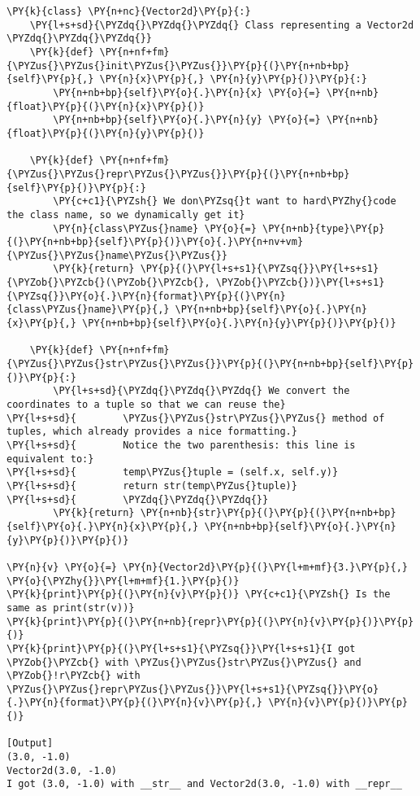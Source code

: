 \begin{Verbatim}[label=\makebox{\url{https://github.com/lucabaldini/cmepda/tree/master/slides/latex/snippets/vector2d\_printable.py}},commandchars=\\\{\}]
\PY{k}{class} \PY{n+nc}{Vector2d}\PY{p}{:}
    \PY{l+s+sd}{\PYZdq{}\PYZdq{}\PYZdq{} Class representing a Vector2d \PYZdq{}\PYZdq{}\PYZdq{}}   
    \PY{k}{def} \PY{n+nf+fm}{\PYZus{}\PYZus{}init\PYZus{}\PYZus{}}\PY{p}{(}\PY{n+nb+bp}{self}\PY{p}{,} \PY{n}{x}\PY{p}{,} \PY{n}{y}\PY{p}{)}\PY{p}{:}
        \PY{n+nb+bp}{self}\PY{o}{.}\PY{n}{x} \PY{o}{=} \PY{n+nb}{float}\PY{p}{(}\PY{n}{x}\PY{p}{)}
        \PY{n+nb+bp}{self}\PY{o}{.}\PY{n}{y} \PY{o}{=} \PY{n+nb}{float}\PY{p}{(}\PY{n}{y}\PY{p}{)}
   
    \PY{k}{def} \PY{n+nf+fm}{\PYZus{}\PYZus{}repr\PYZus{}\PYZus{}}\PY{p}{(}\PY{n+nb+bp}{self}\PY{p}{)}\PY{p}{:}
        \PY{c+c1}{\PYZsh{} We don\PYZsq{}t want to hard\PYZhy{}code the class name, so we dynamically get it}
        \PY{n}{class\PYZus{}name} \PY{o}{=} \PY{n+nb}{type}\PY{p}{(}\PY{n+nb+bp}{self}\PY{p}{)}\PY{o}{.}\PY{n+nv+vm}{\PYZus{}\PYZus{}name\PYZus{}\PYZus{}}
        \PY{k}{return} \PY{p}{(}\PY{l+s+s1}{\PYZsq{}}\PY{l+s+s1}{\PYZob{}\PYZcb{}(\PYZob{}\PYZcb{}, \PYZob{}\PYZcb{})}\PY{l+s+s1}{\PYZsq{}}\PY{o}{.}\PY{n}{format}\PY{p}{(}\PY{n}{class\PYZus{}name}\PY{p}{,} \PY{n+nb+bp}{self}\PY{o}{.}\PY{n}{x}\PY{p}{,} \PY{n+nb+bp}{self}\PY{o}{.}\PY{n}{y}\PY{p}{)}\PY{p}{)}
        
    \PY{k}{def} \PY{n+nf+fm}{\PYZus{}\PYZus{}str\PYZus{}\PYZus{}}\PY{p}{(}\PY{n+nb+bp}{self}\PY{p}{)}\PY{p}{:}
        \PY{l+s+sd}{\PYZdq{}\PYZdq{}\PYZdq{} We convert the coordinates to a tuple so that we can reuse the}
\PY{l+s+sd}{        \PYZus{}\PYZus{}str\PYZus{}\PYZus{} method of tuples, which already provides a nice formatting.}
\PY{l+s+sd}{        Notice the two parenthesis: this line is equivalent to:}
\PY{l+s+sd}{        temp\PYZus{}tuple = (self.x, self.y)}
\PY{l+s+sd}{        return str(temp\PYZus{}tuple)}
\PY{l+s+sd}{        \PYZdq{}\PYZdq{}\PYZdq{}}
        \PY{k}{return} \PY{n+nb}{str}\PY{p}{(}\PY{p}{(}\PY{n+nb+bp}{self}\PY{o}{.}\PY{n}{x}\PY{p}{,} \PY{n+nb+bp}{self}\PY{o}{.}\PY{n}{y}\PY{p}{)}\PY{p}{)}
     
\PY{n}{v} \PY{o}{=} \PY{n}{Vector2d}\PY{p}{(}\PY{l+m+mf}{3.}\PY{p}{,} \PY{o}{\PYZhy{}}\PY{l+m+mf}{1.}\PY{p}{)}
\PY{k}{print}\PY{p}{(}\PY{n}{v}\PY{p}{)} \PY{c+c1}{\PYZsh{} Is the same as print(str(v))}
\PY{k}{print}\PY{p}{(}\PY{n+nb}{repr}\PY{p}{(}\PY{n}{v}\PY{p}{)}\PY{p}{)}
\PY{k}{print}\PY{p}{(}\PY{l+s+s1}{\PYZsq{}}\PY{l+s+s1}{I got \PYZob{}\PYZcb{} with \PYZus{}\PYZus{}str\PYZus{}\PYZus{} and \PYZob{}!r\PYZcb{} with \PYZus{}\PYZus{}repr\PYZus{}\PYZus{}}\PY{l+s+s1}{\PYZsq{}}\PY{o}{.}\PY{n}{format}\PY{p}{(}\PY{n}{v}\PY{p}{,} \PY{n}{v}\PY{p}{)}\PY{p}{)}

[Output]
(3.0, -1.0)
Vector2d(3.0, -1.0)
I got (3.0, -1.0) with __str__ and Vector2d(3.0, -1.0) with __repr__
\end{Verbatim}